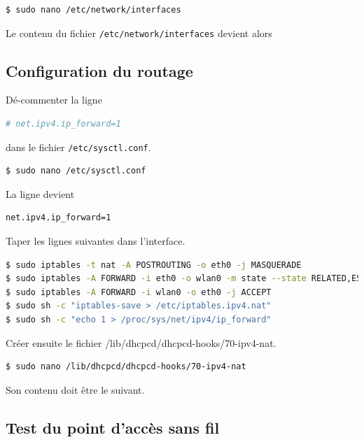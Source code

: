 \documentclass[11pt]{article}
\begin{document}
\begin{lstlisting}[language=bash]
$ sudo nano /etc/network/interfaces
\end{lstlisting}

Le contenu du fichier \lstinline{/etc/network/interfaces} devient alors



\subsection{Configuration du routage}

Dé-commenter la ligne
\begin{lstlisting}[language=bash]
# net.ipv4.ip_forward=1
\end{lstlisting}
dans le fichier \lstinline{/etc/sysctl.conf}.

\begin{lstlisting}[language=bash]
$ sudo nano /etc/sysctl.conf
\end{lstlisting}

La ligne devient
\begin{lstlisting}[language=bash]
net.ipv4.ip_forward=1
\end{lstlisting}

Taper les lignes suivantes dans l'interface.

\begin{lstlisting}[language=bash]
$ sudo iptables -t nat -A POSTROUTING -o eth0 -j MASQUERADE
$ sudo iptables -A FORWARD -i eth0 -o wlan0 -m state --state RELATED,ESTABLISHED -j ACCEPT
$ sudo iptables -A FORWARD -i wlan0 -o eth0 -j ACCEPT
$ sudo sh -c "iptables-save > /etc/iptables.ipv4.nat"
$ sudo sh -c "echo 1 > /proc/sys/net/ipv4/ip_forward"
\end{lstlisting}

Créer ensuite le fichier {/lib/dhcpcd/dhcpcd-hooks/70-ipv4-nat}.
\begin{lstlisting}[language=bash]
$ sudo nano /lib/dhcpcd/dhcpcd-hooks/70-ipv4-nat
\end{lstlisting}

Son contenu doit être le suivant.



\subsection{Test du point d'accès sans fil}
\end{document}
